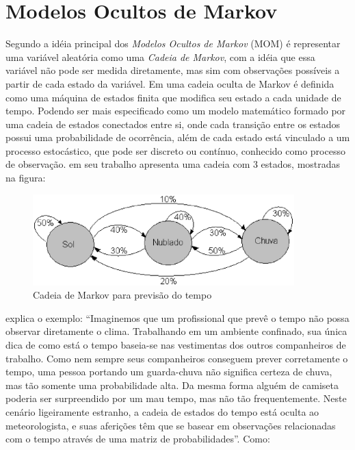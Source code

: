 \section{Modelos Ocultos de Markov}
Segundo  a idéia principal dos \textit{Modelos Ocultos de Markov} (MOM) é representar uma variável aleatória como uma \textit{Cadeia de Markov}, com a idéia que essa variável não pode ser medida diretamente, mas sim com observações possíveis a partir de cada estado da variável. Em  uma cadeia oculta de Markov é definida como uma máquina de estados finita que modifica seu estado a cada unidade de tempo. Podendo ser mais especificado como um modelo matemático formado por uma cadeia de estados conectados entre si, onde cada transição entre os estados possui uma probabilidade de ocorrência, além de cada estado está vinculado a um processo estocástico, que pode ser discreto ou contínuo, conhecido como processo de observação.
 em seu trabalho apresenta uma cadeia com 3 estados, mostradas na figura:

\begin{figure}[H]
\includegraphics[width=0.9\textwidth]{graficos/markov.eps}
\caption{Cadeia de Markov para previsão do tempo}
\label{Modelos Ocultos de Markov}
\end{figure}

 explica o exemplo:
“Imaginemos que um profissional que prevê o tempo não possa observar diretamente o clima. Trabalhando em um ambiente confinado, sua única dica de como está o tempo baseia-se nas vestimentas dos outros companheiros de trabalho. Como nem sempre seus companheiros conseguem prever corretamente o tempo, uma pessoa portando um guarda-chuva não significa certeza de chuva, mas tão somente uma probabilidade alta. Da mesma forma alguém de camiseta poderia ser surpreendido por um mau tempo, mas não tão frequentemente. Neste cenário ligeiramente estranho, a cadeia de estados do tempo está oculta ao meteorologista, e suas aferições têm que se basear em observações relacionadas com o tempo através de uma matriz de probabilidades”. Como:

